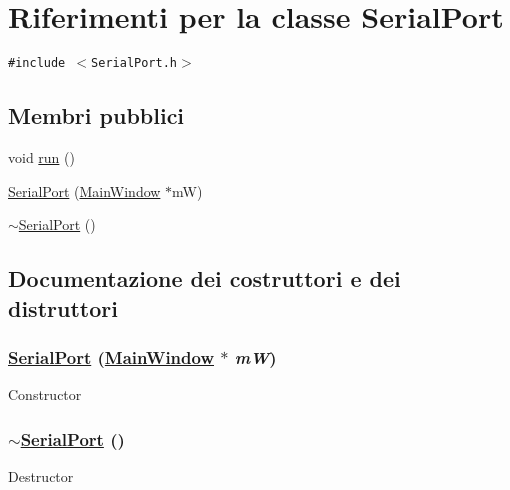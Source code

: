 \hypertarget{classSerialPort}{
\section{Riferimenti per la classe Serial\-Port}
\label{classSerialPort}
}
{\tt \#include $<$Serial\-Port.h$>$}

\subsection*{Membri pubblici}
\begin{CompactItemize}
\item 
void \hyperlink{classSerialPort_13a43e6d814de94978c515cb084873b1}{run} ()
\item 
\hyperlink{classSerialPort_e759c132d52bdeaddba3ebd737c77821}{Serial\-Port} (\hyperlink{classMainWindow}{Main\-Window} $\ast$m\-W)
\item 
\hyperlink{classSerialPort_0f67eac24b774429a205b00237f12039}{$\sim$Serial\-Port} ()
\end{CompactItemize}


\subsection{Documentazione dei costruttori e dei distruttori}
\hypertarget{classSerialPort_e759c132d52bdeaddba3ebd737c77821}{
\subsubsection[SerialPort]{\setlength{\rightskip}{0pt plus 5cm}\hyperlink{classSerialPort}{Serial\-Port} (\hyperlink{classMainWindow}{Main\-Window} $\ast$ {\em m\-W})}}
\label{classSerialPort_e759c132d52bdeaddba3ebd737c77821}


Constructor \hypertarget{classSerialPort_0f67eac24b774429a205b00237f12039}{
\subsubsection[$\sim$SerialPort]{\setlength{\rightskip}{0pt plus 5cm}$\sim$\hyperlink{classSerialPort}{Serial\-Port} ()}}
\label{classSerialPort_0f67eac24b774429a205b00237f12039}


Destructor 

